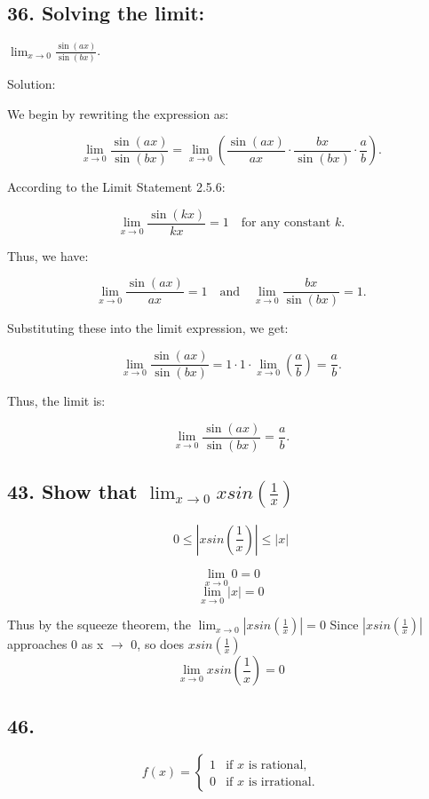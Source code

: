 \documentclass{article}
\begin{document}
\subsection*{36. Solving the limit:}$\lim_{x \to 0} \frac{\sin(ax)}{\sin(bx)} $.

Solution:

We begin by rewriting the expression as:

\[
\lim_{x \to 0} \frac{\sin(ax)}{\sin(bx)} = \lim_{x \to 0} \left( \frac{\sin(ax)}{ax} \cdot \frac{bx}{\sin(bx)} \cdot \frac{a}{b} \right).
\]

According to the Limit Statement 2.5.6:

\[
\lim_{x \to 0} \frac{\sin(kx)}{kx} = 1 \quad \text{for any constant } k.
\]

Thus, we have:

\[
\lim_{x \to 0} \frac{\sin(ax)}{ax} = 1 \quad \text{and} \quad \lim_{x \to 0} \frac{bx}{\sin(bx)} = 1.
\]

Substituting these into the limit expression, we get:

\[
\lim_{x \to 0} \frac{\sin(ax)}{\sin(bx)} = 1 \cdot 1 \cdot\lim_{x \to 0} \left(\frac{a}{b} \right) = \frac{a}{b}.
\]

Thus, the limit is:

\[
\lim_{x \to 0} \frac{\sin(ax)}{\sin(bx)} = \frac{a}{b}.
\]

\subsection*{43. Show that $\lim_{x \to 0} x sin(\frac{1}{x})$}

\[
0 \leq \left|xsin\left(\frac{1}{x}\right)\right| \leq |x|
\]

\[
\lim_{x\to0} 0 =  0
\]
\[
\lim_{x\to 0} |x| = 0
\]

Thus by the squeeze theorem, the $\lim_{x\to 0} \left|xsin\left(\frac{1}{x}\right)\right| = 0$
Since $\left|xsin\left(\frac{1}{x}\right)\right|$ approaches 0 as x $\to$ 0, so does $xsin\left(\frac{1}{x}\right)$
\[
\lim_{x \to 0}xsin\left(\frac{1}{x}\right) = 0
\]

\subsection*{46.}


\[
f(x) = 
\begin{cases} 
1 & \text{if } x \text{ is rational}, \\
0 & \text{if } x \text{ is irrational}.
\end{cases}
\]
\end{document}
